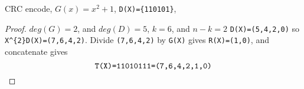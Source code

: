 \documentclass[./answersheet.tex]{subfiles}
\begin{document}
\begin{wts}
    CRC encode, $G(x)=x^2+1$, \verb|D(X)={110101}|,
\end{wts}
\begin{proof}
    $deg(G)=2$, and $deg(D) = 5$, $k=6$, and $n-k = 2$ \verb|D(X)=(5,4,2,0)| so \verb|X^{2}D(X)=(7,6,4,2)|. Divide \verb|(7,6,4,2)| by \verb|G(X)| gives \verb|R(X)=(1,0)|, and concatenate gives\[\verb|T(X)=11010111=(7,6,4,2,1,0)|\]
\end{proof}
\end{document}
